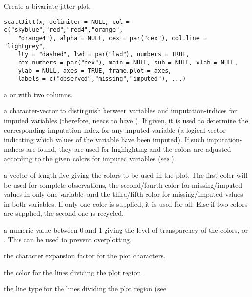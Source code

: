 %
\begin{Description}\relax
Create a bivariate jitter plot.
\end{Description}
%
\begin{Usage}
\begin{verbatim}
scattJitt(x, delimiter = NULL, col = c("skyblue","red","red4","orange",
    "orange4"), alpha = NULL, cex = par("cex"), col.line = "lightgrey",
    lty = "dashed", lwd = par("lwd"), numbers = TRUE,
    cex.numbers = par("cex"), main = NULL, sub = NULL, xlab = NULL,
    ylab = NULL, axes = TRUE, frame.plot = axes,
    labels = c("observed","missing","imputed"), ...)
\end{verbatim}
\end{Usage}
%
\begin{Arguments}
\begin{ldescription}
\item[\code{x}] a  or  with two columns.
\item[\code{delimiter}] a character-vector to distinguish between variables
and imputation-indices for imputed variables (therefore,  needs
to have ). If given, it is used to determine the
corresponding imputation-index for any imputed variable (a logical-vector
indicating which values of the variable have been imputed). If such
imputation-indices are found, they are used for highlighting and the
colors are adjusted	according to the given colors for imputed variables
(see ).
\item[\code{col}] a vector of length five giving the colors to be used in the 
plot.  The first color will be used for complete observations, the 
second/fourth color for missing/imputed values in only one variable,
and the third/fifth color for missing/imputed values in both variables.
If only one color is supplied, it is used for all.
Else if two colors are supplied, the second one is recycled.
\item[\code{alpha}] a numeric value between 0 and 1 giving the level of 
transparency of the colors, or .  This can be used to
prevent overplotting.
\item[\code{cex}] the character expansion factor for the plot characters.
\item[\code{col.line}] the color for the lines dividing the plot region.
\item[\code{lty}] the line type for the lines dividing the plot region (see 

\end{ldescription}
\end{Arguments}
